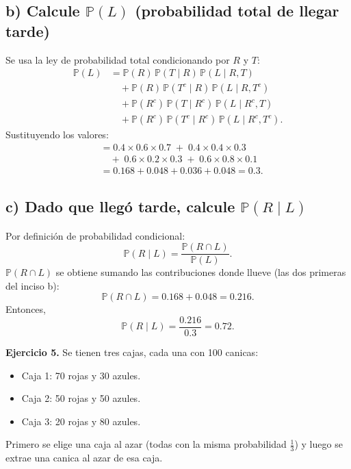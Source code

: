 \documentclass[letterpaper, 12pt]{article}
\begin{document}
    \subsection*{b) Calcule \(\mathbb{P}(L)\) (probabilidad total de llegar tarde)}  
    Se usa la ley de probabilidad total condicionando por \(R\) y \(T\):
    \[
    \begin{aligned}
    \mathbb{P}(L) &= \mathbb{P}(R)\,\mathbb{P}(T\mid R)\,\mathbb{P}(L\mid R,T) \\
    &\quad + \mathbb{P}(R)\,\mathbb{P}(T^c\mid R)\,\mathbb{P}(L\mid R,T^c) \\
    &\quad + \mathbb{P}(R^c)\,\mathbb{P}(T\mid R^c)\,\mathbb{P}(L\mid R^c,T) \\
    &\quad + \mathbb{P}(R^c)\,\mathbb{P}(T^c\mid R^c)\,\mathbb{P}(L\mid R^c,T^c).
    \end{aligned}
    \]  
    Sustituyendo los valores:
    \[
    \begin{aligned}
    &= 0.4 \times 0.6 \times 0.7 \;+\; 0.4 \times 0.4 \times 0.3 \\
    &\quad +\; 0.6 \times 0.2 \times 0.3 \;+\; 0.6 \times 0.8 \times 0.1 \\
    &= 0.168 + 0.048 + 0.036 + 0.048 = 0.3.
    \end{aligned}
    \]
    \newpage
    \subsection*{c) Dado que llegó tarde, calcule \(\mathbb{P}(R \mid L)\)}  
    Por definición de probabilidad condicional:
    \[
    \mathbb{P}(R \mid L) = \frac{\mathbb{P}(R \cap L)}{\mathbb{P}(L)}.
    \]  
    \(\mathbb{P}(R \cap L)\) se obtiene sumando las contribuciones donde llueve (las dos primeras del inciso b):
    \[
    \mathbb{P}(R \cap L) = 0.168 + 0.048 = 0.216.
    \]  
    Entonces,
    \[
    \mathbb{P}(R \mid L) = \frac{0.216}{0.3} = 0.72.
    \]
    \newpage

    \textbf{Ejercicio 5.} Se tienen tres cajas, cada una con 100 canicas:
    \begin{itemize}
    \item Caja 1: 70 rojas y 30 azules.
    \item Caja 2: 50 rojas y 50 azules.
    \item Caja 3: 20 rojas y 80 azules.
    \end{itemize}
    Primero se elige una caja al azar (todas con la misma probabilidad \(\frac{1}{3}\)) y luego se extrae una canica al azar de esa caja.
\end{document}
